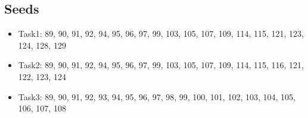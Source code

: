 \subsection{Seeds}

\begin{itemize}
    \item Task1: 89, 90, 91, 92, 94, 95, 96, 97, 99, 103, 105, 107, 109, 114, 115, 121, 123, 124, 128, 129
    \item Task2: 89, 90, 91, 92, 94, 95, 96, 97, 99, 103, 105, 107, 109, 114, 115, 116, 121, 122, 123, 124
    \item Task3: 89, 90, 91, 92, 93, 94, 95, 96, 97, 98, 99, 100, 101, 102, 103, 104, 105, 106, 107, 108
\end{itemize}
